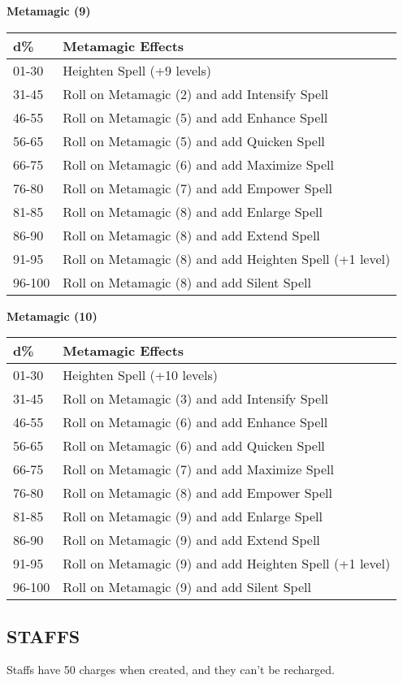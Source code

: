\documentclass{article}
\begin{document}
\vspace{12pt}
\textbf{Metamagic (9) }

\begin{tabular}{|>{\raggedright}p{38pt}|>{\raggedright}p{235pt}|}
\hline
d\textbf{\%} & M\textbf{etamagic Effects }\tabularnewline
\hline
01-30 & Heighten Spell (+9 levels)\tabularnewline
\hline
31-45 & Roll on Metamagic (2) and add Intensify Spell \tabularnewline
\hline
46-55 & Roll on Metamagic (5) and add Enhance Spell \tabularnewline
\hline
56-65 & Roll on Metamagic (5) and add Quicken Spell \tabularnewline
\hline
66-75 & Roll on Metamagic (6) and add Maximize Spell \tabularnewline
\hline
76-80 & Roll on Metamagic (7) and add Empower Spell \tabularnewline
\hline
81-85 & Roll on Metamagic (8) and add Enlarge Spell \tabularnewline
\hline
86-90 & Roll on Metamagic (8) and add Extend Spell \tabularnewline
\hline
91-95 & Roll on Metamagic (8) and add Heighten Spell (+1 level) \tabularnewline
\hline
96-100 & Roll on Metamagic (8) and add Silent Spell \tabularnewline
\hline
\end{tabular}

\vspace{12pt}
\textbf{Metamagic (10) }

\begin{tabular}{|>{\raggedright}p{38pt}|>{\raggedright}p{235pt}|}
\hline
d\textbf{\%} & M\textbf{etamagic Effects }\tabularnewline
\hline
01-30 & Heighten Spell (+10 levels) \tabularnewline
\hline
31-45 & Roll on Metamagic (3) and add Intensify Spell \tabularnewline
\hline
46-55 & Roll on Metamagic (6) and add Enhance Spell \tabularnewline
\hline
56-65 & Roll on Metamagic (6) and add Quicken Spell \tabularnewline
\hline
66-75 & Roll on Metamagic (7) and add Maximize Spell \tabularnewline
\hline
76-80 & Roll on Metamagic (8) and add Empower Spell \tabularnewline
\hline
81-85 & Roll on Metamagic (9) and add Enlarge Spell \tabularnewline
\hline
86-90 & Roll on Metamagic (9) and add Extend Spell \tabularnewline
\hline
91-95 & Roll on Metamagic (9) and add Heighten Spell (+1 level) \tabularnewline
\hline
96-100 & Roll on Metamagic (9) and add Silent Spell \tabularnewline
\hline
\end{tabular}

\vspace{24pt}
\subsection*{{\LARGE{}STAFFS }}

Staffs have 50 charges when created, and they can't be recharged. 
\end{document}
